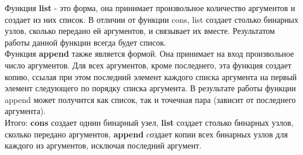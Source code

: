 \documentclass[12pt]{report}
\begin{document}
Функция \textbf{list} - это форма, она принимает произвольное количество аргументов и создает из них список. В отличии от функции cons, list создает столько бинарных узлов, сколько передано ей аргументов, и связывает их вместе. Результатом работы данной функции всегда будет список.\\

Функция \textbf{append} также является формой. Она принимает на вход произвольное число аргументов. Для всех аргументов, кроме последнего, эта функция создает копию, ссылая при этом последний элемент каждого списка аргумента на первый элемент следующего по порядку списка аргумента. В результате работы функции append может получится как список, так и точечная пара (зависит от последнего аргумента). \\

Итого: \textbf{cons} создает однин бинарный узел, \textbf{list} создает столько бинарных узлов, сколько передано аргументов, \textbf{append} cоздает копии всех бинарных узлов для каждого из аргументов, исключая последний аргумент.\\
\end{document}

